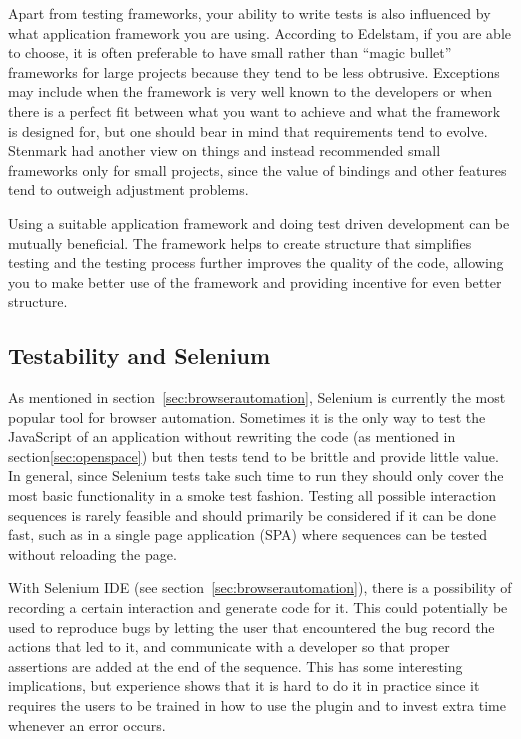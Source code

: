 \documentclass[11pt]{article}
\begin{document}
Apart from testing frameworks, your ability to write tests is also influenced by what application framework you are using. According to Edelstam, if you are able to choose, it is often preferable to have small rather than ``magic bullet'' frameworks for large projects because they tend to be less obtrusive. Exceptions may include when the framework is very well known to the developers or when there is a perfect fit between what you want to achieve and what the framework is designed for, but one should bear in mind that requirements tend to evolve. \cite[questions~48-50]{Edelstam} Stenmark had another view on things and instead recommended small frameworks only for small projects, since the value of bindings and other features tend to outweigh adjustment problems. \cite[questions~12-14]{Stenmark}

Using a suitable application framework and doing test driven development can be mutually beneficial. The framework helps to create structure that simplifies testing and the testing process further improves the quality of the code, allowing you to make better use of the framework and providing incentive for even better structure. \cite[question~15]{Stenmark}

\subsection{Testability and Selenium}

As mentioned in section~\ref{sec:browserautomation}, Selenium is currently the most popular tool for browser automation. Sometimes it is the only way to test the JavaScript of an application without rewriting the code\cite[question~43]{Stenmark} (as mentioned in section\ref{sec:openspace}) but then tests tend to be brittle and provide little value. In general, since Selenium tests take such time to run they should only cover the most basic functionality in a smoke test fashion. \cite[questions~16-17]{Stenmark} Testing all possible interaction sequences is rarely feasible and should primarily be considered if it can be done fast, such as in a single page application (SPA) where sequences can be tested without reloading the page. \cite[question~44]{Edelstam}

With Selenium IDE (see section~\ref{sec:browserautomation}), there is a possibility of recording a certain interaction and generate code for it. This could potentially be used to reproduce bugs by letting the user that encountered the bug record the actions that led to it, and communicate with a developer so that proper assertions are added at the end of the sequence. This has some interesting implications, but experience shows that it is hard to do it in practice since it requires the users to be trained in how to use the plugin and to invest extra time whenever an error occurs. \cite[questions~42-43]{Edelstam}
\end{document}
